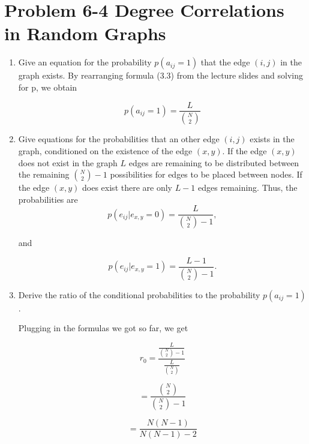 \section{Problem 6-4 Degree Correlations in Random Graphs}

\begin{enumerate}
	\item Give an equation for the probability $p(a_{ij} = 1)$ that the edge $(i,j)$ in the graph exists.
	By rearranging formula (3.3) from the lecture slides and solving for p, we obtain
	
	\begin{equation}
	p(a_{ij} = 1) = \frac{L}{\binom{N}{2}}
	\end{equation}
	
	\item Give equations for the probabilities that an other edge $(i,j)$ exists in the graph, conditioned on the existence of the edge $(x,y)$.
	If the edge $(x,y)$ does not exist in the graph $L$ edges are remaining to be distributed between the remaining $\binom{N}{2} - 1$ possibilities for edges to be placed between nodes.  If the edge $(x,y)$ does exist there are only $L-1$ edges remaining. Thus, the probabilities are
	\begin{equation}
	p(e_{ij}|e_{x,y}=0) = \frac{L}{\binom{N}{2} - 1},
	\end{equation}
	
	and
	
	\begin{equation}
	p(e_{ij}|e_{x,y}=1) = \frac{L - 1}{\binom{N}{2} - 1}.
	\end{equation}
	
	\item Derive the ratio of the conditional probabilities to the probability $p(a_{ij} = 1)$.
	
	Plugging in the formulas we got so far,  we get
	
	\begin{equation}
	r_0 =\frac{
					 \frac{L}{\binom{N}{2} - 1}
					 }
					 {
					 \frac{L}{\binom{N}{2}}
					 }
	\end{equation}
	
	\begin{equation}
	= \frac{\binom{N}{2}}{\binom{N}{2} - 1}
	\end{equation}
	
	\begin{equation}
	= \frac{N(N - 1)}{N(N - 1) - 2}
	\end{equation}
	

\end{enumerate}
